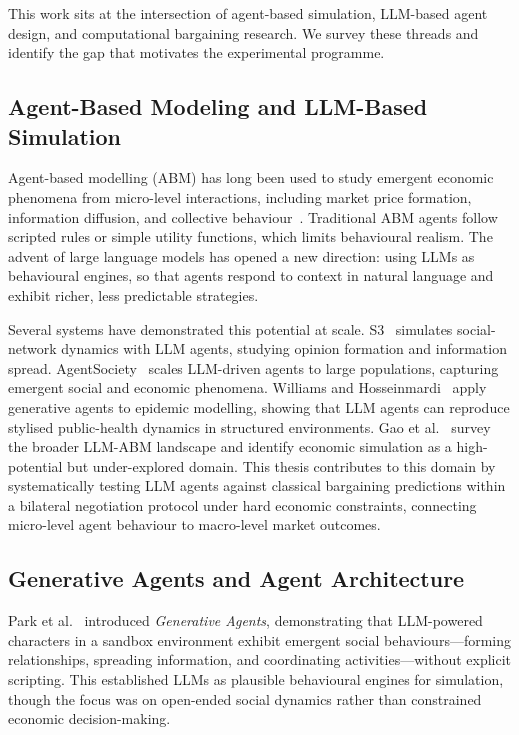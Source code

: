 \label{sec:related}

This work sits at the intersection of agent-based simulation, LLM-based agent design, and computational bargaining research.  We survey these threads and identify the gap that motivates the experimental programme.

\subsection{Agent-Based Modeling and LLM-Based Simulation}
\label{sec:rw_abm}

Agent-based modelling (ABM) has long been used to study emergent economic phenomena from micro-level interactions, including market price formation, information diffusion, and collective behaviour~\cite{gao2024survey}.  Traditional ABM agents follow scripted rules or simple utility functions, which limits behavioural realism.  The advent of large language models has opened a new direction: using LLMs as behavioural engines, so that agents respond to context in natural language and exhibit richer, less predictable strategies.

Several systems have demonstrated this potential at scale.  S3~\cite{gao2023s3} simulates social-network dynamics with LLM agents, studying opinion formation and information spread.  AgentSociety~\cite{pang2025agentsociety} scales LLM-driven agents to large populations, capturing emergent social and economic phenomena.  Williams and Hosseinmardi~\cite{williams2023epidemic} apply generative agents to epidemic modelling, showing that LLM agents can reproduce stylised public-health dynamics in structured environments.  Gao et al.~\cite{gao2024survey} survey the broader LLM-ABM landscape and identify economic simulation as a high-potential but under-explored domain.  This thesis contributes to this domain by systematically testing LLM agents against classical bargaining predictions within a bilateral negotiation protocol under hard economic constraints, connecting micro-level agent behaviour to macro-level market outcomes.

\subsection{Generative Agents and Agent Architecture}
\label{sec:rw_agents}

Park et al.~\cite{park2023generative} introduced \emph{Generative Agents}, demonstrating that LLM-powered characters in a sandbox environment exhibit emergent social behaviours---forming relationships, spreading information, and coordinating activities---without explicit scripting.  This established LLMs as plausible behavioural engines for simulation, though the focus was on open-ended social dynamics rather than constrained economic decision-making.

